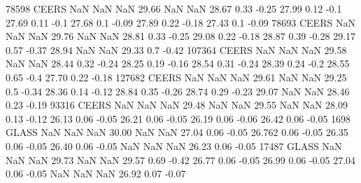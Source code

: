 		78598   CEERS   NaN NaN NaN   29.66 NaN NaN   28.67 0.33 -0.25    27.99 0.12 -0.1    27.69 0.11 -0.1    27.68 0.1 -0.09    27.89 0.22 -0.18    27.43 0.1 -0.09
		78693   CEERS   NaN NaN NaN   29.76 NaN NaN   28.81 0.33 -0.25    29.08 0.22 -0.18    28.87 0.39 -0.28    29.17 0.57 -0.37    28.94 NaN NaN    29.33 0.7 -0.42
		107364   CEERS   NaN NaN NaN   29.58 NaN NaN   28.44 0.32 -0.24    28.25 0.19 -0.16    28.54 0.31 -0.24    28.39 0.24 -0.2    28.55 0.65 -0.4    27.70 0.22 -0.18
		127682   CEERS   NaN NaN NaN   29.61 NaN NaN   29.25 0.5 -0.34    28.36 0.14 -0.12    28.84 0.35 -0.26    28.74 0.29 -0.23    29.07 NaN NaN   28.46 0.23 -0.19
		93316   CEERS   NaN NaN NaN   29.48 NaN NaN   29.55 NaN NaN   28.09 0.13 -0.12    26.13 0.06 -0.05    26.21 0.06 -0.05    26.19 0.06 -0.06    26.42 0.06 -0.05
		1698   GLASS   NaN NaN NaN   30.00 NaN NaN   27.04 0.06 -0.05    26.762 0.06 -0.05    26.35 0.06 -0.05    26.40 0.06 -0.05    NaN NaN NaN   26.23 0.06 -0.05
		17487   GLASS   NaN NaN NaN   29.73 NaN NaN   29.57 0.69 -0.42    26.77 0.06 -0.05    26.99 0.06 -0.05    27.04 0.06 -0.05    NaN NaN NaN   26.92 0.07 -0.07
